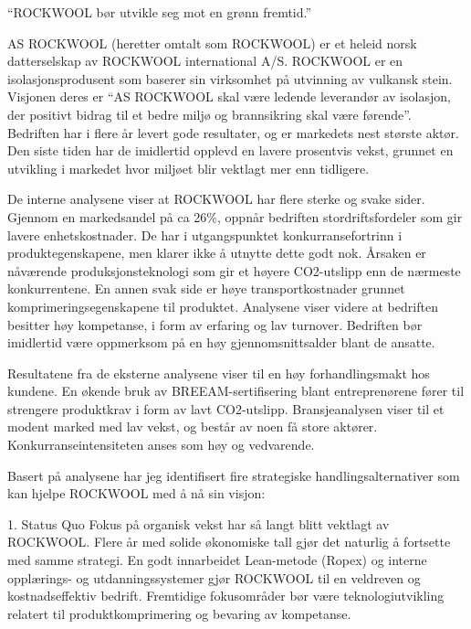 \textquotedblleft ROCKWOOL bør utvikle seg mot en grønn fremtid.\textquotedblright

\indent \newline
AS ROCKWOOL (heretter omtalt som ROCKWOOL) er et heleid norsk datterselskap av ROCKWOOL international A/S. ROCKWOOL er en isolasjonsprodusent som baserer sin virksomhet på utvinning av vulkansk stein. Visjonen deres er \textquotedblleft AS ROCKWOOL skal være ledende leverandør av isolasjon, der positivt bidrag til et bedre miljø og brannsikring skal være førende\textquotedblright. Bedriften har i flere år levert gode resultater, og er markedets nest største aktør. Den siste tiden har de imidlertid opplevd en lavere prosentvis vekst, grunnet en utvikling i markedet hvor miljøet blir vektlagt mer enn tidligere.

\indent \newline
De interne analysene viser at ROCKWOOL har flere sterke og svake sider. Gjennom en markedsandel på ca 26\%, oppnår bedriften stordriftsfordeler som gir lavere enhetskostnader. De har i utgangspunktet konkurransefortrinn i produktegenskapene, men klarer ikke å utnytte dette godt nok. Årsaken er nåværende produksjonsteknologi som gir et høyere CO2-utslipp enn de nærmeste konkurrentene. En annen svak side er høye transportkostnader grunnet komprimeringsegenskapene til produktet. Analysene viser videre at bedriften besitter høy kompetanse, i form av erfaring og lav turnover. Bedriften bør imidlertid være oppmerksom på en høy gjennomsnittsalder blant de ansatte. 

\indent \newline
Resultatene fra de eksterne analysene viser til en høy forhandlingsmakt hos kundene. En økende bruk av BREEAM-sertifisering blant entreprenørene fører til strengere produktkrav i form av lavt CO2-utslipp. Bransjeanalysen viser til et modent marked med lav vekst, og består av noen få store aktører. Konkurranseintensiteten anses som høy og vedvarende. 

\indent \newline
Basert på analysene har jeg identifisert fire strategiske handlingsalternativer som kan hjelpe ROCKWOOL med å nå sin visjon:

1.	Status Quo
Fokus på organisk vekst har så langt blitt vektlagt av ROCKWOOL. Flere år med solide økonomiske tall gjør det naturlig å fortsette med samme strategi. En godt innarbeidet Lean-metode (Ropex) og interne opplærings- og utdanningssystemer gjør ROCKWOOL til en veldreven og kostnadseffektiv bedrift. Fremtidige fokusområder bør være teknologiutvikling relatert til produktkomprimering og bevaring av kompetanse. 

